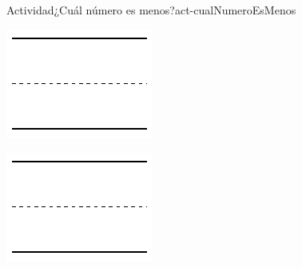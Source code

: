 \documentclass[20pt]{extarticle}
\begin{document}
\begin{activity}{Actividad}{¿Cuál número es menos?}{act-cualNumeroEsMenos}
\begin{sidebyside}{2}{0.1}{0.1}{0.2}
\begin{sbspanel}{0.3}%
\includegraphics[max width=\linewidth, center]{external/svg-source/tikz-file-148545.pdf}
\end{sbspanel}%
\begin{sbspanel}{0.3}%
\includegraphics[max width=\linewidth, center]{external/svg-source/tikz-file-148545.pdf}
\end{sbspanel}%
\end{sidebyside}%
\vspace{1cm}
\begin{sidebyside}{2}{0.1}{0.1}{0.2}%
\begin{sbspanel}{0.3}%

\end{sbspanel}
\end{sidebyside}
\end{activity}
\end{document}
